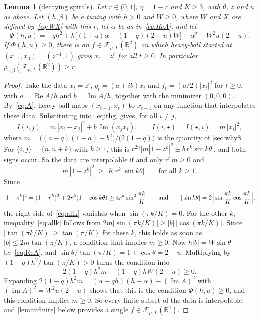 \documentclass[11pt, a4paper]{article}
\newtheorem{lemma}{Lemma}
\theoremstyle{definition}
\newcommand{\R}{\mathbb{R}}
\newcommand{\F}{\mathcal{F}_{\mu,L}}
\newcommand{\re}{\operatorname{Re}}
\newcommand{\im}{\operatorname{Im}}
\begin{document}
\begin{lemma}[decaying spirals]
  \label{lem:spiral}
  Let $r\in(0,1]$, $\eta=1-r$ and $K\ge3$, with $\theta$, $z$ and $u$ as above. Let $(h,\beta)$ be a tuning with $h>0$
  and $W\ge0$, where $W$ and $X$ are defined by~\eqref{eq:WX} with this $r$, let $\alpha$ be as in~\eqref{eq:ReA}, and
  let
  \begin{equation}
    \Phi(h,u)=-qh^2+h\bigl[(1+q)\alpha-(1-q)(2-u)W\bigr]-\alpha^2-W^2u(2-u).
    \label{eq:Phi}
  \end{equation}
  If $\Phi(h,u)\ge0$, there is an $f\in\F(\R^2)$ on which heavy-ball started at $(x_{-1},x_0)=(z^{-1},1)$ gives
  $x_t=z^t$ for all $t\ge0$. In particular $\rho_{\gamma,\beta}(\F(\R^2))\ge r$.
\end{lemma}

\begin{proof}
  Take the data $x_t=z^t$, $g_t=(a+ib)x_t$ and $f_t=(a/2)|x_t|^2$ for $t\ge0$, with $a=\re A/h$ and $b=\im A/h$,
  together with the minimizer $(0,0,0)$. By~\eqref{eq:A}, heavy-ball maps $(x_{t-1},x_t)$ to $x_{t+1}$ on any function
  that interpolates these data. Substituting into~\eqref{eq:thg} gives, for all $i\ne j$,
  \begin{equation}
    I(i,j)=m\,|x_i-x_j|^2+b\,\im(x_j\bar x_i),\qquad I(i,\star)=I(\star,i)=m\,|x_i|^2,
    \label{eq:reduction}
  \end{equation}
  where $m=\bigl((a-q)(1-a)-b^2\bigr)/\bigl(2(1-q)\bigr)$ is the quantity of \cref{sec:why8}.
  For $\{i,j\}=\{n,n+k\}$ with $k\ge1$, this is $r^{2n}\bigl[m|1-z^k|^2\pm b\,r^k\sin k\theta\bigr]$, and both signs
  occur. So the data are interpolable if and only if $m\ge0$ and
  \begin{equation}
    m\,|1-z^k|^2\ \ge\ |b|\,r^k|\sin k\theta|\qquad\text{for all }k\ge1.
    \label{eq:allk}
  \end{equation}
  Since
  \[
    |1-z^k|^2=(1-r^k)^2+2r^k(1-\cos k\theta)\ge4r^k\sin^2\frac{\pi k}K
    \qquad\text{and}\qquad
    |\sin k\theta|=2\,\Bigl|\sin\frac{\pi k}K\cos\frac{\pi k}K\Bigr|,
  \]
  the right side of~\eqref{eq:allk} vanishes when $\sin(\pi k/K)=0$. For the other $k$, inequality~\eqref{eq:allk}
  follows from $2m|\sin(\pi k/K)|\ge|b|\,|\cos(\pi k/K)|$. Since $|\tan(\pi k/K)|\ge\tan(\pi/K)$ for these $k$, this
  holds as soon as $|b|\le2m\tan(\pi/K)$, a condition that implies $m\ge0$. Now $h|b|=W\sin\theta$ by~\eqref{eq:ReA}, and
  $\sin\theta/\tan(\pi/K)=1+\cos\theta=2-u$. Multiplying by $(1-q)h^2/\tan(\pi/K)>0$ turns the condition into
  \[
    2(1-q)h^2m-(1-q)hW(2-u)\ge0.
  \]
  Expanding $2(1-q)h^2m=(\alpha-qh)(h-\alpha)-(\im A)^2$ with $(\im A)^2=W^2u(2-u)$ shows that this is the condition
  $\Phi(h,u)\ge0$, and this condition implies $m\ge0$. So every finite subset of the data is interpolable, and
  \cref{lem:infinite} below provides a single $f\in\F(\R^2)$.
\end{proof}
\end{document}
